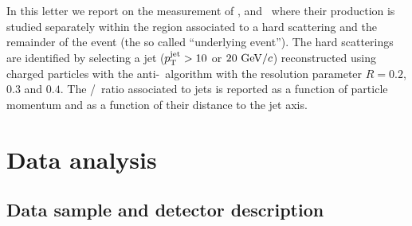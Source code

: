 In this letter we report on the measurement of \lda, \alda and \ks\ where their production is studied separately within the region associated to a hard scattering and the remainder of the event (the so called ``underlying event''). The hard scatterings are identified by selecting a jet ($p_{\mathrm{T}}^{\mathrm{jet}} > 10$ or $20~\mathrm{GeV}/c$) reconstructed using charged particles with the anti-\kt\ algorithm with the resolution parameter $R=0.2$, $0.3$ and $0.4$. The \lda/\ks\ ratio associated to jets is reported as a function of particle momentum and as a function of their distance to the jet axis.


\section{Data analysis}

\subsection{Data sample and detector description}

